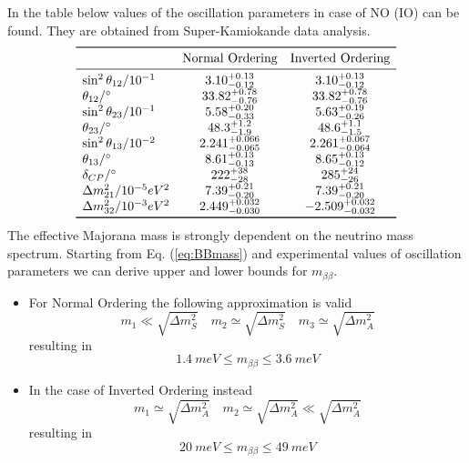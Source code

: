 \documentclass{subnucbo}
\begin{document}
In the table below values of the oscillation parameters in case of NO (IO) can be found. They are obtained from Super-Kamiokande data analysis. %
\[
\begin{array}{lcc}
\toprule
&\text{Normal Ordering}&\text{Inverted Ordering}\\
\midrule
\sin^2\theta_{12}/10^{-1}&3.10_{-0.12}^{+0.13}&3.10_{-0.12}^{+0.13}\\
\theta_{12}/\si{\degree}&33.82_{-0.76}^{+0.78}&33.82_{-0.76}^{+0.78}\\
\sin^2\theta_{23}/10^{-1}&5.58_{-0.33}^{+0.20}&5.63_{-0.26}^{+0.19}\\
\theta_{23}/\si{\degree}&48.3_{-1.9}^{+1.2}&48.6_{-1.5}^{+1.1}\\
\sin^2\theta_{13}/10^{-2}&2.241_{-0.065}^{+0.066}&2.261_{-0.064}^{+0.067}\\
\theta_{13}/\si{\degree}&8.61_{-0.13}^{+0.13}&8.65_{-0.12}^{+0.13}\\
\delta_{CP}/\si{\degree}&222_{-28}^{+38}&285_{-26}^{+24}\\
\Delta m^2_{21}/10^{-5}eV^2&7.39_{-0.20}^{+0.21}&7.39_{-0.20}^{+0.21}\\
\Delta m_{32}^2/10^{-3}eV^2&2.449_{-0.030}^{+0.032}&-2.509_{-0.032}^{+0.032}\\
\bottomrule
\end{array}
\]
The effective Majorana mass is strongly dependent on the neutrino mass spectrum. Starting from Eq. (\ref{eq:BBmass}) and experimental values of oscillation parameters we can derive upper and lower bounds for $m_{\beta\beta}$.
\begin{itemize}
\item For Normal Ordering the following approximation is valid
	\begin{equation}
	m_1\ll\sqrt{\Delta m_S^2} \quad m_2\simeq\sqrt{\Delta m_S^2} \quad m_3\simeq\sqrt{\Delta m_A^2}
	\end{equation}
	resulting in 
	\begin{equation}
	\SI{1.4}{meV} \leq m_{\beta\beta} \leq \SI{3.6}{meV}
	\end{equation}
\item In the case of Inverted Ordering instead
	\begin{equation}
	m_1\simeq\sqrt{\Delta m_A^2} \quad m_2\simeq\sqrt{\Delta m_A^2} \ll\sqrt{\Delta m_A^2}
	\end{equation}
	resulting in
	\begin{equation}
	\SI{20}{meV}\leq m_{\beta\beta} \leq \SI{49}{meV}
	\end{equation}
\end{itemize}
\end{document}
